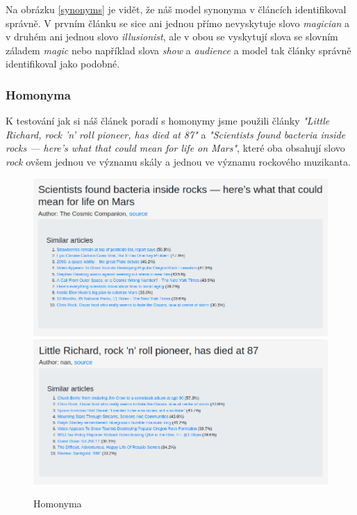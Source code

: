 \documentclass[11pt]{scrartcl} %
\begin{document}
\bigskip

Na obrázku \ref{synonyms} je vidět, že náš model synonyma v článcích identifikoval správně. V prvním článku se sice ani jednou přímo nevyskytuje slovo \emph{magician} a v druhém ani jednou slovo \emph{illusionist}, ale v obou se vyskytují slova se slovním záladem \emph{magic} nebo například slova \emph{show} a \emph{audience} a model tak články správně identifikoval jako podobné.

\subsubsection{Homonyma}

K testování jak si náš článek poradí s homonymy jsme použili články \emph{"Little Richard, rock 'n' roll pioneer, has died at 87"} a \emph{"Scientists found bacteria inside rocks — here’s what that could mean for life on Mars"}, které oba obsahují slovo \emph{rock} ovšem jednou ve významu skály a jednou ve významu rockového muzikanta.

\begin{figure}[h] %
	\centering
	\includegraphics[width=0.7\columnwidth]{images/homonyms_0.png}
	\includegraphics[width=0.7\columnwidth]{images/homonyms_1.png}
	\caption{Homonyma}
	\label{homonyms}
\end{figure}

\bigskip
\end{document}
